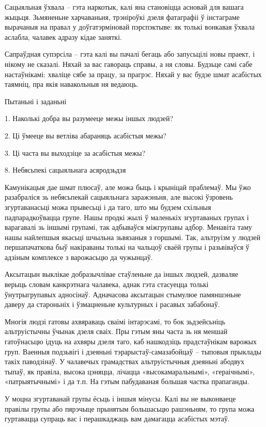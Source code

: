 Сацыяльная ўхвала – гэта наркотык, калі яна становіцца асновай для вашага жыцьця. Зьмяненьне харчаваньня, трэніроўкі дзеля фатаграфіі ў інстаграме вырачаныя на правал у доўгатэрміновай пэрспэктыве: як толькі вонкавая ўхвала аслабла, чалавек адразу кідае заняткі. 

Сапраўдная супэрсіла – гэта калі вы пачалі бегаць або запусьцілі новы праект, і нікому не сказалі. Няхай за вас гавораць справы, а ня словы. Будзьце самі сабе настаўнікамі: хваліце сябе за працу, за прагрэс. Няхай у вас будзе шмат асабістых таямніц, пра якія навакольныя ня ведаюць. 

Пытаньні і заданьні

1. Наколькі добра вы разумееце межы іншых людзей?

2. Ці ўмееце вы ветліва абараняць асабістыя межы?

3. Ці часта вы выходзіце за асабістыя межы?


8. Небясьпекі сацыяльнага асяродзьдзя

Камунікацыя дае шмат плюсаў, але можа быць і крыніцай праблемаў. Мы ўжо разабраліся зь небясьпекай сацыяльнага заражэньня, але высокі ўзровень згуртаванасьці можа прывесьці і да таго, што мы будзем схільныя падпарадкоўвацца групе. Нашы продкі жылі ў маленькіх згуртаваных групах і варагавалі зь іншымі групамі, так адбываўся міжгрупавы адбор. Менавіта таму нашы найлепшыя якасьці шчыльна зьвязаныя з горшымі. Так, альтруізм у людзей першапачаткова быў накіраваны толькі на чальцоў сваёй групы і разьвіваўся ў адзіным комплексе з варожасьцю да чужынцаў. 

Аксытацын выклікае добразычлівае стаўленьне да іншых людзей, дазваляе верыць словам канкрэтнага чалавека, аднак гэта стасуецца толькі ўнутрыгрупавых адносінаў. Адначасова аксытацын стымулюе памяншэньне даверу да староньніх і ўзмацненьне культурных і расавых забабонаў.

Многія людзі гатовы ахвяраваць сваімі інтарэсамі, то бок зьдзейсьніць альтруістычны ўчынак дзеля сваіх. Пры гэтым яны часта зь ня меншай гатоўнасьцю ідуць на ахвяры дзеля таго, каб нашкодзіць прадстаўнікам варожых груп. Ваенныя подзьвігі і дзеяньні тэрарыстаў-самазабойцаў – тыповыя прыклады такіх паводзінаў. У чалавечых грамадствах альтруістычныя дзеяньні абодвух тыпаў, як правіла, высока цэняцца, лічацца «высокамаральнымі», «гераічнымі», «патрыятычнымі» і да т.п. На гэтым пабудаваная большая частка прапаганды.

У моцна згуртаванай групы ёсьць і іншыя мінусы. Калі вы не выконваеце правілы групы або пярэчыце прынятым большасьцю рашэньням, то група можа гуртавацца супраць вас і перашкаджаць вам дамагацца асабістых мэтаў.

